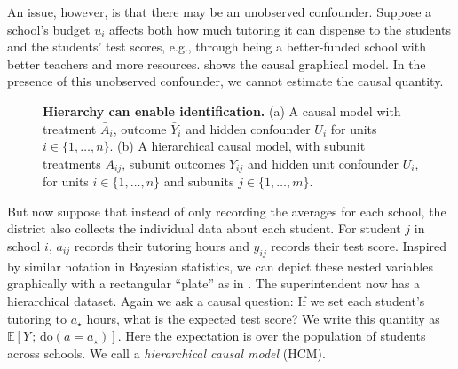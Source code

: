 \documentclass[12pt]{article}
\newcommand{\E}[1]{\mathbb{E}\left[ #1 \right]}
\newcommand{\rmdo}{\mathrm{do}}
\newcommand{\s}{\, ; \,}
\begin{document}
An issue, however, is that there may be an unobserved confounder.
Suppose a school's budget $u_i$ affects both how much tutoring it can
dispense to the students and the students' test scores, e.g., through
being a better-funded school with better teachers and more resources.
 shows the causal graphical model. In the presence
of this unobserved confounder, we cannot estimate the causal quantity.

\begin{figure}[t]
\centering
\begin{subfigure}[c]{0.33\textwidth}
\caption{}  \label{fig:cm_intro}
\centering
{}
\end{subfigure}
\begin{subfigure}[c]{0.33\textwidth}
\caption{} \label{fig:hcm_intro}
\centering
{}
\end{subfigure}

\caption{\textbf{Hierarchy can enable identification.} (a) A causal model with treatment $\bar{A}_i$, outcome $\bar{Y}_i$ and hidden confounder $U_i$ for units $i \in \{1, \ldots, n\}$.
        (b) A hierarchical causal model, with subunit treatments $A_{ij}$, subunit outcomes $Y_{ij}$ and hidden unit confounder $U_i$, for units $i \in \{1, \ldots, n\}$ and subunits $j \in \{1, \ldots, m\}$.
        } \label{fig:intro}
\end{figure}

 
But now suppose that instead of only recording the averages for each
school, the district also collects the individual data about each
student. For student $j$ in school $i$, $a_{ij}$ records their
tutoring hours and $y_{ij}$ records their test score. Inspired by
similar notation in Bayesian statistics, we can depict these nested
variables graphically with a rectangular ``plate'' as in
. The superintendent now has a hierarchical dataset. Again we ask a causal question: If we set each
student's tutoring to $a_\star$ hours, what is the expected test
score? We write this quantity as $\E{Y \s \rmdo(a=a_\star)}$. Here the
expectation is over the population of students across schools. We call
 a \textit{hierarchical causal model} (HCM).
\end{document}
